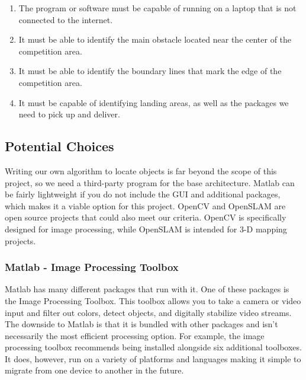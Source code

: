 \documentclass[letterpaper, 10, draftclsnofoot, onecolumn, compsoc]{IEEEtran}
\begin{document}
\begin{enumerate}
\item{The program or software must be capable of running on a 
laptop that is not connected to the internet.}

\item{It must be able to identify the main obstacle located near 
the center of the competition area.}

\item{It must be able to identify the boundary lines that mark the 
edge of the competition area.}

\item{It must be capable of identifying landing areas, as well as 
the packages we need to pick up and deliver. }
\end{enumerate}

\subsection{Potential Choices}

Writing our own algorithm to locate objects is far beyond the scope 
of this project, so we need a third-party program for the base 
architecture. Matlab can be fairly lightweight if you do not 
include the GUI and additional packages, which makes it a viable 
option for this project. OpenCV and OpenSLAM are open source 
projects that could also meet our criteria. OpenCV is specifically 
designed for image processing, while OpenSLAM is intended for 3-D 
mapping projects. 

\subsubsection{Matlab - Image Processing Toolbox}

Matlab has many different packages that run with it. One of these 
packages is the Image Processing Toolbox\cite{r9}. This toolbox allows you to take a camera or video input and filter out colors, detect 
objects, and digitally stabilize video streams. The downside to 
Matlab is that it is bundled with other packages and isn't 
necessarily the most efficient processing option. For example, the 
image processing toolbox recommends being installed alongside six 
additional toolboxes. It does, however, run on a variety of 
platforms and languages making it simple to migrate from one device 
to another in the future. 

\end{document}
